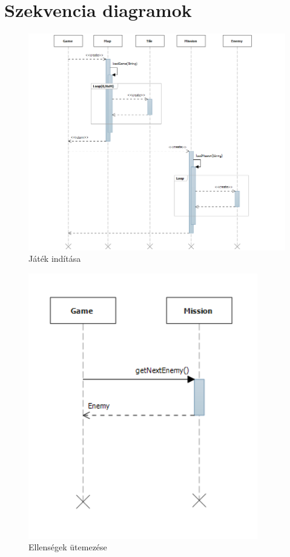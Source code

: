 \section{Szekvencia diagramok}

\begin{figure}[H]
\begin{center}
\includegraphics[width=15cm]{images/starting_game.png}
\caption{Játék indítása}
\label{fig:starting_game}
\end{center}
\end{figure}

\begin{figure}[H]
\begin{center}
\includegraphics[width=10cm]{images/scheduling_enemies.png}
\caption{Ellenségek ütemezése}
\label{fig:scheduling_enemies}
\end{center}
\end{figure}

